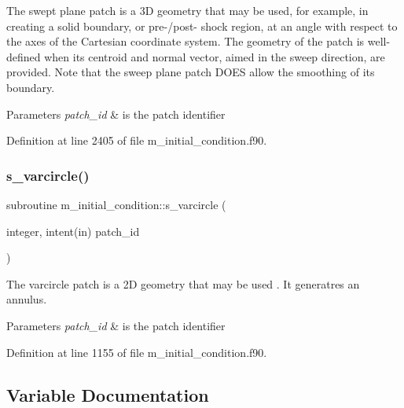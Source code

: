 The swept plane patch is a 3D geometry that may be used, for example, in creating a solid boundary, or pre-\//post-\/ shock region, at an angle with respect to the axes of the Cartesian coordinate system. The geometry of the patch is well-\/defined when its centroid and normal vector, aimed in the sweep direction, are provided. Note that the sweep plane patch D\+O\+ES allow the smoothing of its boundary. 


\begin{DoxyParams}{Parameters}
{\em patch\+\_\+id} & is the patch identifier \\
\hline
\end{DoxyParams}


Definition at line 2405 of file m\+\_\+initial\+\_\+condition.\+f90.

\mbox{\label{namespacem__initial__condition_a3e1c1480513e75b444ce7a77ed0fe598}} 
\subsubsection{\texorpdfstring{s\+\_\+varcircle()}{s\_varcircle()}}
{\footnotesize\ttfamily subroutine m\+\_\+initial\+\_\+condition\+::s\+\_\+varcircle (\begin{DoxyParamCaption}\item[{integer, intent(in)}]{patch\+\_\+id }\end{DoxyParamCaption})}



The varcircle patch is a 2D geometry that may be used . It generatres an annulus. 


\begin{DoxyParams}{Parameters}
{\em patch\+\_\+id} & is the patch identifier \\
\hline
\end{DoxyParams}


Definition at line 1155 of file m\+\_\+initial\+\_\+condition.\+f90.



\subsection{Variable Documentation}
\mbox{\label{namespacem__initial__condition_a8a559b4d7a1e1e69f5e3b9ea0474e3fa}} 
